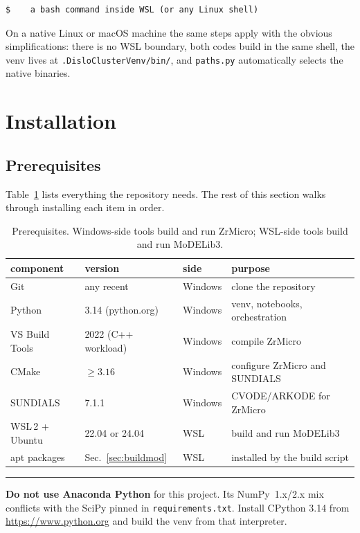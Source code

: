 \documentclass[11pt]{article}
\newcommand{\ZrM}{\textsf{ZrMicro}}
\newcommand{\MoD}{\textsf{MoDELib3}}
\newcommand{\file}[1]{\texttt{\footnotesize #1}}
\newenvironment{warnbox}
  {\par\medskip\noindent
   \begin{minipage}{\textwidth}
   {\color{red!60!black}\rule{\textwidth}{0.8pt}}\par\smallskip
   \small\noindent{\color{red!60!black}\textbf{Warning.}}\space}
  {\par\smallskip\noindent{\color{red!60!black}\rule{\textwidth}{0.8pt}}
   \end{minipage}\par\medskip}
\begin{document}
\begin{lstlisting}[style=wsl]
$    a bash command inside WSL (or any Linux shell)
\end{lstlisting}

On a native Linux or macOS machine the same steps apply with the obvious
simplifications: there is no WSL boundary, both codes build in the same
shell, the venv lives at \file{.DisloClusterVenv/bin/}, and
\file{paths.py} automatically selects the native binaries.

\section{Installation}
\label{sec:install}

\subsection{Prerequisites}

Table~\ref{tab:prereq} lists everything the repository needs. The rest of
this section walks through installing each item in order.

\begin{table}[htbp]
\centering
\caption{Prerequisites. Windows-side tools build and run \ZrM{}; WSL-side
tools build and run \MoD{}.}
\label{tab:prereq}
\small
\begin{tabular}{@{}p{}lll@{}}
\toprule
component & version & side & purpose \\
\midrule
Git & any recent & Windows & clone the repository \\
Python & 3.14 (python.org) & Windows & venv, notebooks, orchestration \\
VS Build Tools & 2022 (C++ workload) & Windows & compile \ZrM{} \\
CMake & $\ge 3.16$ & Windows & configure \ZrM{} and SUNDIALS \\
SUNDIALS & 7.1.1 & Windows & CVODE/ARKODE for \ZrM{} \\
WSL\,2 + Ubuntu & 22.04 or 24.04 & WSL & build and run \MoD{} \\
apt packages & Sec.~\ref{sec:buildmod} & WSL & installed by the build script \\
\bottomrule
\end{tabular}
\end{table}

\begin{warnbox}
\textbf{Do not use Anaconda Python} for this project. Its NumPy~1.x/2.x mix
conflicts with the SciPy pinned in \file{requirements.txt}. Install CPython
3.14 from \url{https://www.python.org} and build the venv from that
interpreter.
\end{warnbox}
\end{document}
